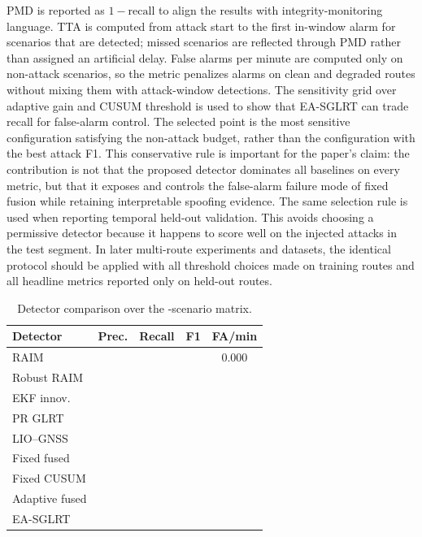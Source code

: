 \documentclass[journal]{IEEEtran}
\begin{document}
PMD is reported as $1-\mathrm{recall}$ to align the results with integrity-monitoring language.
TTA is computed from attack start to the first in-window alarm for scenarios that are detected; missed scenarios are reflected through PMD rather than assigned an artificial delay.
False alarms per minute are computed only on non-attack scenarios, so the metric penalizes alarms on clean and degraded routes without mixing them with attack-window detections.
The sensitivity grid over adaptive gain and CUSUM threshold is used to show that EA-SGLRT can trade recall for false-alarm control.
The selected point is the most sensitive configuration satisfying the non-attack budget, rather than the configuration with the best attack F1.
This conservative rule is important for the paper's claim: the contribution is not that the proposed detector dominates all baselines on every metric, but that it exposes and controls the false-alarm failure mode of fixed fusion while retaining interpretable spoofing evidence.
The same selection rule is used when reporting temporal held-out validation.
This avoids choosing a permissive detector because it happens to score well on the injected attacks in the test segment.
In later multi-route experiments and datasets, the identical protocol should be applied with all threshold choices made on training routes and all headline metrics reported only on held-out routes.

\begin{table}[!t]
\centering
\caption{Detector comparison over the \MatrixScenarioCount{}-scenario matrix.}
\label{tab:matrix}
\begin{tabular}{lcccc}
\toprule
Detector & Prec. & Recall & F1 & FA/min \\
\midrule
RAIM & \RaimOnlyPrecision{} & \RaimOnlyRecall{} & \RaimOnlyFone{} & 0.000 \\
Robust RAIM & \RobustRaimPrecision{} & \RobustRaimRecall{} & \RobustRaimFone{} & \RobustRaimFalseAlarm{} \\
EKF innov. & \EkfInnovationPrecision{} & \EkfInnovationRecall{} & \EkfInnovationFone{} & \EkfInnovationFalseAlarm{} \\
PR GLRT & \PseudorangeGlrtPrecision{} & \PseudorangeGlrtRecall{} & \PseudorangeGlrtFone{} & \PseudorangeGlrtFalseAlarm{} \\
LIO--GNSS & \LioResidualPrecision{} & \LioResidualRecall{} & \LioResidualFone{} & \LioResidualFalseAlarm{} \\
Fixed fused & \FixedFusedPrecision{} & \FixedFusedRecall{} & \FixedFusedMatrixFone{} & \FixedFusedMatrixFalseAlarm{} \\
Fixed CUSUM & \FixedCusumFusedPrecision{} & \FixedCusumFusedRecall{} & \FixedCusumFusedFone{} & \FixedCusumFusedFalseAlarm{} \\
Adaptive fused & \AdaptiveFusedPrecision{} & \AdaptiveFusedRecall{} & \AdaptiveFusedFone{} & \AdaptiveFusedFalseAlarm{} \\
EA-SGLRT & \AdaptiveSeqPrecision{} & \AdaptiveSeqRecall{} & \AdaptiveSeqFone{} & \AdaptiveSeqFalseAlarm{} \\
\bottomrule
\end{tabular}
\end{table}
\end{document}
